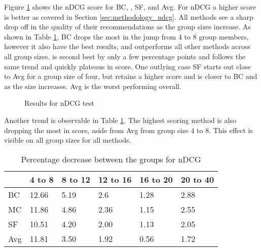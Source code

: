 Figure \ref{fig:ndcg} shows the nDCG score for BC, \MC, SF, and Avg. For nDCG a higher score is better as covered in Section \ref{sec:methodology_ndcg}.
All methods see a sharp drop off in the quality of their recommendations as the group sizes increase.
As shown in Table \ref{tbl:ndcg}, BC drops the most in the jump from 4 to 8 group members, however it also have the best results, and outperforms all other methods across all group sizes.
\MC is second best by only a few percentage points and follows the same trend and quickly plateaus in score.
One outlying case SF starts out close to Avg for a group size of four, but retains a higher score and is closer to BC and \MC as the size increases.
Avg is the worst performing overall.

\begin{figure}[H]
	\caption{Results for nDCG test}\label{fig:ndcg}
\end{figure}

Another trend is observable in Table \ref{tbl:ndcg}. The highest scoring method is also dropping the most in score, aside from Avg from group size 4 to 8. This effect is visible on all group sizes for all methods.

\begin{table}[H]
	\centering
	\begin{tabular}{|l|lllll|}\hline
		& 4 to 8 & 8 to 12 & 12 to 16 & 16 to 20 & 20 to 40 \\\hline
		BC 	& 12.66	& 5.19	& 2.6	& 1.28	& 2.88 \\
		MC  & 11.86	& 4.86	& 2.36	& 1.15	& 2.55 \\
		SF  & 10.51	& 4.20	& 2.00	& 1.13	& 2.05 \\
		Avg	& 11.81	& 3.50 	& 1.92	& 0.56	& 1.72 \\ \hline
	\end{tabular}
	\caption{Percentage decrease between the groups for nDCG}
	\label{tbl:ndcg}
\end{table}

